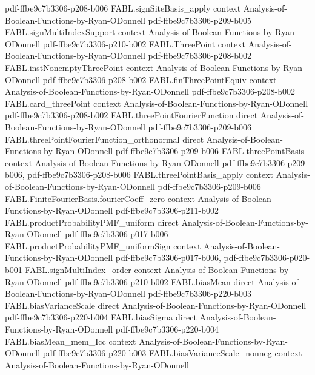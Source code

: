 \begin{theorem}
{    pdf-ffbe9c7b3306-p208-b006}
\proofstep
  {FABL.signSiteBasis_apply}
  {context}
  {Analysis-of-Boolean-Functions-by-Ryan-ODonnell}
  {pdf-ffbe9c7b3306-p209-b005}
\proofstep
  {FABL.signMultiIndexSupport}
  {context}
  {Analysis-of-Boolean-Functions-by-Ryan-ODonnell}
  {pdf-ffbe9c7b3306-p210-b002}
\proofstep
  {FABL.ThreePoint}
  {context}
  {Analysis-of-Boolean-Functions-by-Ryan-ODonnell}
  {pdf-ffbe9c7b3306-p208-b002}
\proofstep
  {FABL.instNonemptyThreePoint}
  {context}
  {Analysis-of-Boolean-Functions-by-Ryan-ODonnell}
  {pdf-ffbe9c7b3306-p208-b002}
\proofstep
  {FABL.finThreePointEquiv}
  {context}
  {Analysis-of-Boolean-Functions-by-Ryan-ODonnell}
  {pdf-ffbe9c7b3306-p208-b002}
\proofstep
  {FABL.card_threePoint}
  {context}
  {Analysis-of-Boolean-Functions-by-Ryan-ODonnell}
  {pdf-ffbe9c7b3306-p208-b002}
\proofstep
  {FABL.threePointFourierFunction}
  {direct}
  {Analysis-of-Boolean-Functions-by-Ryan-ODonnell}
  {pdf-ffbe9c7b3306-p209-b006}
\proofstep
  {FABL.threePointFourierFunction_orthonormal}
  {direct}
  {Analysis-of-Boolean-Functions-by-Ryan-ODonnell}
  {pdf-ffbe9c7b3306-p209-b006}
\proofstep
  {FABL.threePointBasis}
  {context}
  {Analysis-of-Boolean-Functions-by-Ryan-ODonnell}
  {pdf-ffbe9c7b3306-p209-b006,
    pdf-ffbe9c7b3306-p208-b006}
\proofstep
  {FABL.threePointBasis_apply}
  {context}
  {Analysis-of-Boolean-Functions-by-Ryan-ODonnell}
  {pdf-ffbe9c7b3306-p209-b006}
\proofstep
  {FABL.FiniteFourierBasis.fourierCoeff_zero}
  {context}
  {Analysis-of-Boolean-Functions-by-Ryan-ODonnell}
  {pdf-ffbe9c7b3306-p211-b002}
\proofstep
  {FABL.productProbabilityPMF_uniform}
  {direct}
  {Analysis-of-Boolean-Functions-by-Ryan-ODonnell}
  {pdf-ffbe9c7b3306-p017-b006}
\proofstep
  {FABL.productProbabilityPMF_uniformSign}
  {context}
  {Analysis-of-Boolean-Functions-by-Ryan-ODonnell}
  {pdf-ffbe9c7b3306-p017-b006,
    pdf-ffbe9c7b3306-p020-b001}
\proofstep
  {FABL.signMultiIndex_order}
  {context}
  {Analysis-of-Boolean-Functions-by-Ryan-ODonnell}
  {pdf-ffbe9c7b3306-p210-b002}
\proofstep
  {FABL.biasMean}
  {direct}
  {Analysis-of-Boolean-Functions-by-Ryan-ODonnell}
  {pdf-ffbe9c7b3306-p220-b003}
\proofstep
  {FABL.biasVarianceScale}
  {direct}
  {Analysis-of-Boolean-Functions-by-Ryan-ODonnell}
  {pdf-ffbe9c7b3306-p220-b004}
\proofstep
  {FABL.biasSigma}
  {direct}
  {Analysis-of-Boolean-Functions-by-Ryan-ODonnell}
  {pdf-ffbe9c7b3306-p220-b004}
\proofstep
  {FABL.biasMean_mem_Icc}
  {context}
  {Analysis-of-Boolean-Functions-by-Ryan-ODonnell}
  {pdf-ffbe9c7b3306-p220-b003}
\proofstep
  {FABL.biasVarianceScale_nonneg}
  {context}
  {Analysis-of-Boolean-Functions-by-Ryan-ODonnell}

\end{theorem}
